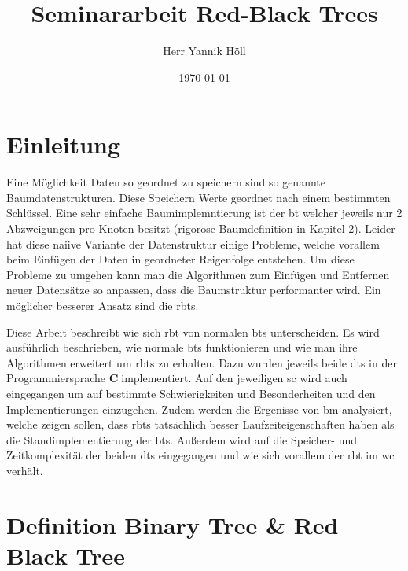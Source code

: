 \documentclass[11pt]{article}
\title{\textbf{Seminararbeit Red-Black Trees}}
\author{Herr Yannik Höll}
\date{\today}
\newcommand{\cpl}{\textbf{C}$\;$}
\begin{document}
\begin{titlingpage}
    \maketitle
\end{titlingpage}
\pagebreak

\tableofcontents
\pagebreak

\glsaddall
\printglossary
\pagebreak

\section{Einleitung}


Eine Möglichkeit Daten so geordnet zu speichern sind so genannte Baumdatenstrukturen. Diese Speichern Werte geordnet nach einem bestimmten Schlüssel.
Eine sehr einfache Baumimplemntierung ist der \gls{bt} welcher jeweils nur 2 Abzweigungen pro Knoten besitzt (rigorose Baumdefinition in Kapitel \ref{def}).
Leider hat diese naiive Variante der Datenstruktur einige Probleme, welche vorallem beim Einfügen der Daten in geordneter Reigenfolge entstehen.
Um diese Probleme zu umgehen kann man die Algorithmen zum Einfügen und Entfernen neuer Datensätze so anpassen, dass die Baumstruktur performanter wird.
Ein möglicher besserer Ansatz sind die \glspl{rbt}.

Diese Arbeit beschreibt wie sich \gls{rbt} von normalen \glspl{bt} unterscheiden. Es wird ausführlich beschrieben, wie normale \glspl{bt} funktionieren und wie man
ihre Algorithmen erweitert um \glspl{rbt} zu erhalten.
Dazu wurden jeweils beide \glspl{dt} in der Programmiersprache \cpl implementiert. Auf den jeweiligen \gls{sc} wird auch eingegangen um auf bestimmte Schwierigkeiten und Besonderheiten und den Implementierungen einzugehen.
Zudem werden die Ergenisse von \gls{bm} analysiert, welche zeigen sollen, dass \glspl{rbt} tatsächlich besser Laufzeiteigenschaften haben als
die Standimplementierung der \glspl{bt}.
Außerdem wird auf die Speicher- und Zeitkomplexität der beiden \glspl{dt} eingegangen und wie sich vorallem der \gls{rbt} im \gls{wc} verhält.


\pagebreak

\section{Definition Binary Tree \& Red Black Tree} \label{def}
\pagebreak
\end{document}
